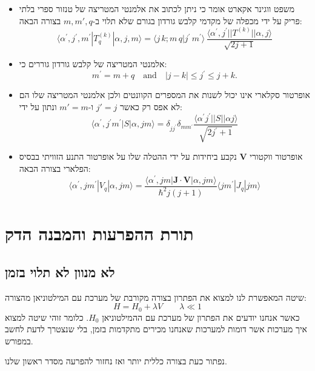 \documentclass{tstextbook}
\begin{document}
\begin{summary}
  \begin{itemize}
    \item משפט ווגינר אקארט אומר כי ניתן לכתוב את אלמנטי המטריצה של טנזור ספרי בלתי פריק על ידי מכפלה של מקדמי קלבש גורדון בגורם שלא תלוי ב-\(m,m',q\) בצורה הבאה:
$$\langle\alpha^{\prime},j^{\prime},m^{\prime}|T_{q}^{(k)}|\alpha,j,m\rangle=\langle j\,k;m\,q|j^{\prime}\,m^{\prime}\rangle\,\frac{\langle\alpha^{\prime},j^{\prime}||T^{(k)}||\alpha,j\rangle}{\sqrt{2j+1}}$$
    \item אלמנטי המטריצה של קלבש גורדון גוררים כי:
$$m^{\prime}=m+q\quad\mathrm{and}\quad|j-k|\leq j^{\prime}\leq j+k.$$
    \item אופרטור סקלארי אינו יכול לשנות את המספרים הקוונטים ולכן אלמנטי המטריצה שלו הם לא אפס רק כאשר \(j'=j\) ו-\(m'=m\) ונתון על ידי:
 $$\langle\alpha^{\prime},j^{\prime}m^{\prime}|S|\alpha,j m\rangle=\delta_{j j^{\prime}}\delta_{m m^{\prime}}\frac{\langle\alpha^{\prime}j^{\prime}||S||\alpha j\rangle}{\sqrt{2j^{\prime}+1}}$$
    \item אופרטור ווקטורי \(\mathbf{V}\) נקבע ביחידות על ידי ההטלה שלו על אופרטור התנע הזוויתי בבסיס הפלארי בצורה הבאה:
 $$\langle\alpha^{\prime},j m^{\prime}|V_{q}|\alpha,j m\rangle=\frac{\langle\alpha^{\prime},j m|\mathbf{J}\cdot\mathbf{V}|\alpha,j m\rangle}{\hbar^{2}j(j+1)}\langle j m^{\prime}|J_{q}|j m\rangle$$
  \end{itemize}
\end{summary}
\section{תורת ההפרעות והמבנה הדק}

\subsection{לא מנוון לא תלוי בזמן}

\begin{definition}
שיטה המאפשרת לנו למצוא את הפתרון בצורה מקורבת של מערכת עם המילטוניאן מהצורה:
$$H= H_{0}+\lambda V\qquad \lambda\ll 1$$
כאשר אנחנו יודעים את הפתרון של מערכת עם ההמילטוניאן \(H_{0}\). כלומר זוהי שיטה למצוא איך מערכות אשר דומות למערכות שאנחנו מכירים מתקדמות בזמן, בלי שנצטרך לדעת לחשב במפורש.

\end{definition}
נפתור כעת בצורה כללית יותר ואז נחזור להפרעה מסדר ראשון שלנו.
\end{document}
